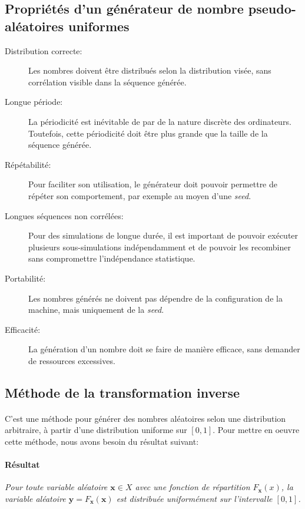 \documentclass[a4paper]{article}
\begin{document}
\subsection{Propriétés d'un générateur de nombre pseudo-aléatoires uniformes}
\begin{description}
	\item[Distribution correcte:]Les nombres doivent être distribués
		selon la distribution visée, sans corrélation visible dans la
		séquence générée.
	\item[Longue période:] La périodicité est inévitable de par de la
		nature discrète des ordinateurs. Toutefois, cette périodicité
		doit être plus grande que la taille de la séquence générée.
	\item[Répétabilité:]Pour faciliter son utilisation, le générateur
		doit pouvoir permettre de répéter son comportement, par exemple
		au moyen d'une \emph{seed}.
	\item[Longues séquences non corrélées:]Pour des simulations de
		longue durée, il est important de pouvoir exécuter plusieurs
		sous-simulations indépendamment et de pouvoir les recombiner
		sans compromettre l'indépendance statistique.
	\item[Portabilité:]Les nombres générés ne doivent pas dépendre de la
		configuration de la machine, mais uniquement de la \emph{seed}.
	\item[Efficacité:]La génération d'un nombre doit se faire de manière
		efficace, sans demander de ressources excessives.
\end{description}

\subsection{Méthode de la transformation inverse}
\paragraph{}
C'est une méthode pour générer des nombres aléatoires
selon une distribution arbitraire, à partir d'une distribution uniforme
sur \([0,1]\). Pour mettre en oeuvre cette méthode, nous avons besoin du
résultat suivant:
\paragraph{Résultat}
\emph{Pour toute variable aléatoire \(\bm x\in X\) avec une fonction
de répartition \(F_{\bm x}(x)\), la variable aléatoire
\(\bm y=F_{\bm x}(\bm x)\) est distribuée uniformément sur
l'intervalle \([0,1]\).}
\end{document}
